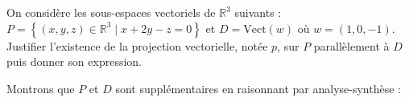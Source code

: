 \documentclass[a4paper,10pt]{report}
\begin{document}
\begin{Exemple} On considère les sous-espaces vectoriels de $\mathbb{R}^3 $ suivants : $P = \left\{ {(x,y,z) \in \mathbb{R}^3 \mid x + 2y - z = 0} \right\}$ et $D = \textrm{Vect} (w){\text{ o\`u }}w = (1,0, - 1)$. Justifier l'existence de la projection vectorielle, notée $p$, sur $P$ parallèlement à $D$ puis donner son expression.

\medskip

%

Montrons que $P$ et $D$ sont supplémentaires en raisonnant par analyse-synthèse :

%
%
%
%

\vspace{22cm}
\end{Exemple}
\end{document}
